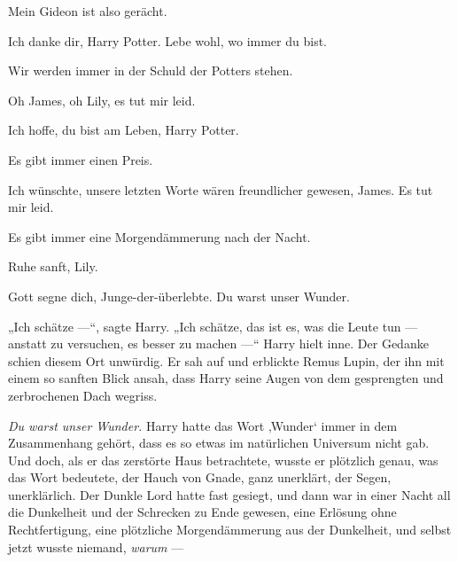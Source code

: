 \begin{center}
Mein Gideon ist also gerächt.

Ich danke dir, Harry Potter. Lebe wohl, wo immer du bist.

Wir werden immer in der Schuld der Potters stehen.

Oh James, oh Lily, es tut mir leid.

Ich hoffe, du bist am Leben, Harry Potter.

Es gibt immer einen Preis.

Ich wünschte, unsere letzten Worte wären freundlicher gewesen, James. Es tut mir leid.

Es gibt immer eine Morgendämmerung nach der Nacht.

Ruhe sanft, Lily.

Gott segne dich, Junge-der-überlebte. Du warst unser Wunder.
\end{center}

„Ich schätze —“, sagte Harry.
„Ich schätze, das ist es, was die Leute tun — anstatt zu versuchen, es besser zu machen —“ Harry hielt inne. Der Gedanke schien diesem Ort unwürdig. Er sah auf und erblickte Remus Lupin, der ihn mit einem so sanften Blick ansah, dass Harry seine Augen von dem gesprengten und zerbrochenen Dach wegriss.

\emph{Du warst unser Wunder.} Harry hatte das Wort ‚Wunder‘ immer in dem Zusammenhang gehört, dass es so etwas im natürlichen Universum nicht gab. Und doch, als er das zerstörte Haus betrachtete, wusste er plötzlich genau, was das Wort bedeutete, der Hauch von Gnade, ganz unerklärt, der Segen, unerklärlich. Der Dunkle Lord hatte fast gesiegt, und dann war in einer Nacht all die Dunkelheit und der Schrecken zu Ende gewesen, eine Erlösung ohne Rechtfertigung, eine plötzliche Morgendämmerung aus der Dunkelheit, und selbst jetzt wusste niemand, \emph{warum} —

